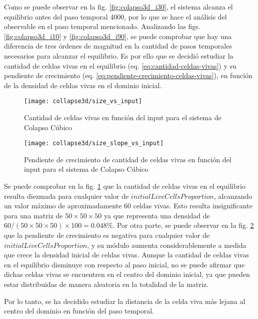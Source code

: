 Como se puede observar en la fig. \ref{fig:colapso3d_i30}, el sistema alcanza el equilibrio
antes del paso temporal 4000, por lo que se hace el análisis del observable en el paso temporal mencionado.
Analizando las figs. \ref{fig:colapso3d_i10} y \ref{fig:colapso3d_i90}, se
puede comprobar que hay una diferencia de tres órdenes de magnitud en la cantidad de pasos temporales necesarios para
alcanzar el equilibrio.
Es por ello que se decidió estudiar la cantidad de celdas vivas en el equilibrio (eq. \ref{eq:cantidad-celdas-vivas})
y su pendiente de crecimiento (eq. \ref{eq:pendiente-crecimiento-celdas-vivas}),
en función de la densidad de celdas vivas en el dominio inicial.

\begin{figure}[H]
    \centering
    \texttt{[image: collapse3d/size\_vs\_input]}
    \caption{Cantidad de celdas vivas en función del input para el sistema de Colapso Cúbico}
    \label{fig:colapso3d_size_vs_input}
\end{figure}
\begin{figure}[H]
    \centering
    \texttt{[image: collapse3d/size\_slope\_vs\_input]}
    \caption{Pendiente de crecimiento de cantidad de celdas vivas en función del input para el sistema de Colapso Cúbico}
    \label{fig:colapso3d_size_slope_vs_input}
\end{figure}

Se puede comprobar en la fig. \ref{fig:colapso3d_size_vs_input} que la cantidad de celdas vivas en el equilibrio
resulta diezmada para cualquier valor de $initialLiveCellsProportion$, alcanzando un valor máximo de aproximadamente
60 celdas vivas.
Esto resulta insignificante para una matriz de $50 \times 50 \times 50$ ya que representa una densidad
de $60/(50 \times 50 \times 50) \times 100 = 0.048\%$.
Por otra parte, se puede observar en la fig. \ref{fig:colapso3d_size_slope_vs_input} que la pendiente de
crecimiento es negativa para cualquier valor de $initialLiveCellsProportion$, y su módulo aumenta
considerablemente a medida que crece la densidad inicial de celdas vivas.
Aunque la cantidad de celdas vivas en el equilibrio disminuye con respecto al paso inicial, no se puede afirmar
que dichas celdas vivas se encuentren en el centro del dominio inicial, ya que pueden estar distribuidas de manera
aleatoria en la totalidad de la matriz.

Por lo tanto, se ha decidido estudiar la distancia de la celda viva más lejana al centro del dominio en función del
paso temporal.

